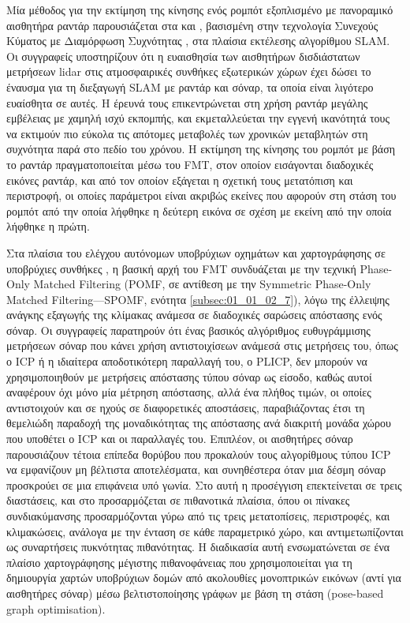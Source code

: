 Μία μέθοδος για την εκτίμηση της κίνησης ενός ρομπότ εξοπλισμένο με πανοραμικό
αισθητήρα ραντάρ παρουσιάζεται στα \cite{Checchin2010} και \cite{Vivet2013},
βασισμένη στην τεχνολογία Συνεχούς Κύματος με Διαμόρφωση Συχνότητας
\cite{Monod1995}, στα πλαίσια εκτέλεσης αλγορίθμου SLAM. Οι συγγραφείς
υποστηρίζουν ότι η ευαισθησία των αισθητήρων δισδιάστατων μετρήσεων lidar στις
ατμοσφαιρικές συνθήκες εξωτερικών χώρων έχει δώσει το έναυσμα για τη διεξαγωγή
SLAM με ραντάρ και σόναρ, τα οποία είναι λιγότερο ευαίσθητα σε αυτές. Η έρευνά
τους επικεντρώνεται στη χρήση ραντάρ μεγάλης εμβέλειας με χαμηλή ισχύ εκπομπής,
και εκμεταλλεύεται την εγγενή ικανότητά τους να εκτιμούν πιο εύκολα τις απότομες
μεταβολές των χρονικών μεταβλητών στη συχνότητα παρά στο πεδίο του χρόνου. Η
εκτίμηση της κίνησης του ρομπότ με βάση το ραντάρ πραγματοποιείται μέσω του
FMT, στον οποίον εισάγονται διαδοχικές εικόνες ραντάρ, και από τον οποίον
εξάγεται η σχετική τους μετατόπιση και περιστροφή, οι οποίες παράμετροι είναι
ακριβώς εκείνες που αφορούν στη στάση του ρομπότ από την οποία λήφθηκε η
δεύτερη εικόνα σε σχέση με εκείνη από την οποία λήφθηκε η πρώτη.

Στα πλαίσια του ελέγχου αυτόνομων υποβρύχιων οχημάτων και χαρτογράφησης σε
υποβρύχιες συνθήκες \cite{Bulow2010}, η βασική αρχή του FMT συνδυάζεται με την
τεχνική Phase-Only Matched Filtering (POMF, σε αντίθεση με την Symmetric
Phase-Only Matched Filtering---SPOMF, ενότητα \ref{subsec:01_01_02_7}), λόγω
της έλλειψης ανάγκης εξαγωγής της κλίμακας ανάμεσα σε διαδοχικές σαρώσεις
απόστασης ενός σόναρ. Οι συγγραφείς παρατηρούν ότι ένας βασικός αλγόριθμος
ευθυγράμμισης μετρήσεων σόναρ που κάνει χρήση αντιστοιχίσεων ανάμεσά στις
μετρήσεις του, όπως ο ICP ή η ιδιαίτερα αποδοτικότερη παραλλαγή του, ο PLICP,
δεν μπορούν να χρησιμοποιηθούν με μετρήσεις απόστασης τύπου σόναρ ως είσοδο,
καθώς αυτοί αναφέρουν όχι μόνο μία μέτρηση απόστασης, αλλά ένα πλήθος τιμών, οι
οποίες αντιστοιχούν και σε ηχούς σε διαφορετικές αποστάσεις, παραβιάζοντας έτσι
τη θεμελιώδη παραδοχή της μοναδικότητας της απόστασης ανά διακριτή μονάδα χώρου
που υποθέτει ο ICP και οι παραλλαγές του.  Επιπλέον, οι αισθητήρες σόναρ
παρουσιάζουν τέτοια επίπεδα θορύβου που προκαλούν τους αλγορίθμους τύπου ICP να
εμφανίζουν μη βέλτιστα αποτελέσματα, και συνηθέστερα όταν μια δέσμη σόναρ
προσκρούει σε μια επιφάνεια υπό γωνία. Στο \cite{Bulow2011} αυτή η προσέγγιση
επεκτείνεται σε τρεις διαστάσεις, και στο \cite{Pfingsthorn2010} προσαρμόζεται
σε πιθανοτικά πλαίσια, όπου οι πίνακες συνδιακύμανσης προσαρμόζονται γύρω από
τις τρεις μετατοπίσεις, περιστροφές, και κλιμακώσεις, ανάλογα με την ένταση σε
κάθε παραμετρικό χώρο, και αντιμετωπίζονται ως συναρτήσεις πυκνότητας
πιθανότητας. Η διαδικασία αυτή ενσωματώνεται σε ένα πλαίσιο χαρτογράφησης
μέγιστης πιθανοφάνειας που χρησιμοποιείται για τη δημιουργία χαρτών υποβρύχιων
δομών από ακολουθίες μονοπτρικών εικόνων (αντί για αισθητήρες σόναρ) μέσω
βελτιστοποίησης γράφων με βάση τη στάση (pose-based graph optimisation).


